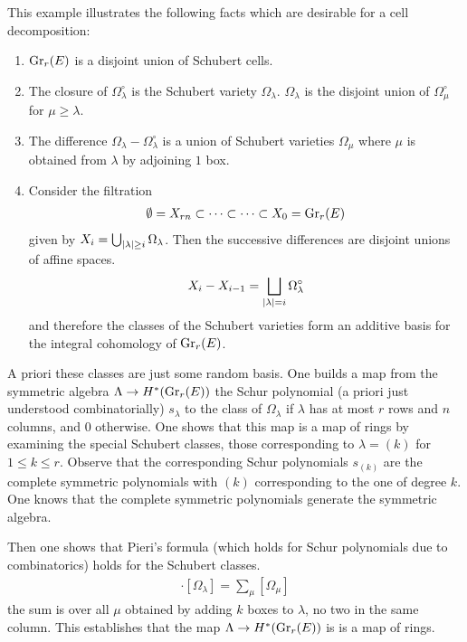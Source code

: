 \documentclass[12pt]{article}
\begin{document}
This example illustrates the following facts which are desirable for a cell decomposition:
\begin{enumerate}
	\item $\operatorname{Gr}_r(E)$ is a disjoint union of Schubert cells.
	\item The closure of $\Omega_\lambda^\circ$ is the Schubert variety $\Omega_\lambda$.
	      $\Omega_\lambda$ is the disjoint union of $\Omega_\mu^\circ$ for $\mu\geq \lambda$.
	\item The difference $\Omega_\lambda - \Omega_\lambda^\circ$ is a union of Schubert varieties $\Omega_\mu$
	      where $\mu$ is obtained from $\lambda$ by adjoining $1$ box.
	\item Consider the filtration \begin{align*}
		      \emptyset = X_{rn} \subset \cdots \subset \cdots \subset X_0 = \operatorname{Gr}_r(E)
	      \end{align*} given by $X_i = \bigcup_{\lvert \lambda\vert\geq i} \Omega_\lambda$. Then the successive differences are disjoint unions of affine spaces. \begin{align*}
		      X_i - X_{i-1} = \bigsqcup_{\lvert \lambda\vert = i} \Omega_\lambda^\circ
	      \end{align*} and therefore the classes of the Schubert varieties form an additive basis for the integral cohomology of $\operatorname{Gr}_r(E)$.
\end{enumerate}

A priori these classes are just some random basis. One builds a map from the symmetric algebra $\Lambda \to H^*(\operatorname{Gr}_r(E))$ the Schur polynomial (a priori just understood combinatorially)
$s_\lambda$ to the class of $\Omega_\lambda$ if $\lambda$ has at most $r$ rows and $n$ columns, and $0$ otherwise. One shows that this map is a map of rings by examining
the special Schubert classes, those corresponding to $\lambda = (k)$ for $1\leq k\leq r$. Observe that the corresponding Schur polynomials $s_{(k)}$ are the complete symmetric polynomials
with $(k)$ corresponding to the one of degree $k$. One knows that the complete symmetric polynomials generate the symmetric algebra.

Then one shows that Pieri's formula (which holds for Schur polynomials due to combinatorics) holds for the Schubert classes. \begin{align*}
	[\Omega_{(k)}] \cdot [\Omega_\lambda] = \sum_{\mu} [\Omega_\mu]
\end{align*} the sum is over all $\mu$ obtained by adding $k$ boxes to $\lambda$, no two in the same column. This establishes that
the map $\Lambda \to H^*(\operatorname{Gr}_r(E))$ is is a map of rings.
\end{document}
